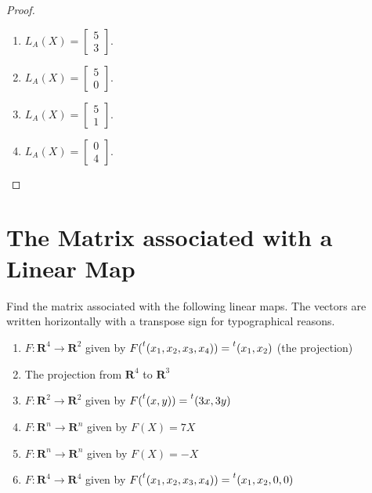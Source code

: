 \begin{proof}
    \begin{enumerate}[label={(\alph*)}]
        \item $L_{A}(X) = \begin{bmatrix}5 \\ 3\end{bmatrix}$.
        \item $L_{A}(X) = \begin{bmatrix}5 \\ 0\end{bmatrix}$.
        \item $L_{A}(X) = \begin{bmatrix}5 \\ 1\end{bmatrix}$.
        \item $L_{A}(X) = \begin{bmatrix}0 \\ 4\end{bmatrix}$.
    \end{enumerate}
\end{proof}

\section{The Matrix associated with a Linear Map}
\setcounter{exercise}{0}

\begin{exercise}
    Find the matrix associated with the following linear maps. The vectors are written horizontally with a transpose sign for typographical reasons.
    \begin{enumerate}[label={(\alph*)}]
        \item $F: \mathbf{R}^{4} \to \mathbf{R}^{2}$ given by $F(\prescript{t}{}(x_{1}, x_{2}, x_{3}, x_{4})) = \prescript{t}{}(x_{1}, x_{2})$ (the projection)
        \item The projection from $\mathbf{R}^{4}$ to $\mathbf{R}^{3}$
        \item $F: \mathbf{R}^{2} \to \mathbf{R}^{2}$ given by $F(\prescript{t}{}(x, y)) = \prescript{t}{}(3x, 3y)$
        \item $F: \mathbf{R}^{n} \to \mathbf{R}^{n}$ given by $F(X) = 7X$
        \item $F: \mathbf{R}^{n} \to \mathbf{R}^{n}$ given by $F(X) = -X$
        \item $F: \mathbf{R}^{4} \to \mathbf{R}^{4}$ given by $F(\prescript{t}{}(x_{1}, x_{2}, x_{3}, x_{4})) = \prescript{t}{}(x_{1}, x_{2}, 0, 0)$
    \end{enumerate}
\end{exercise}

